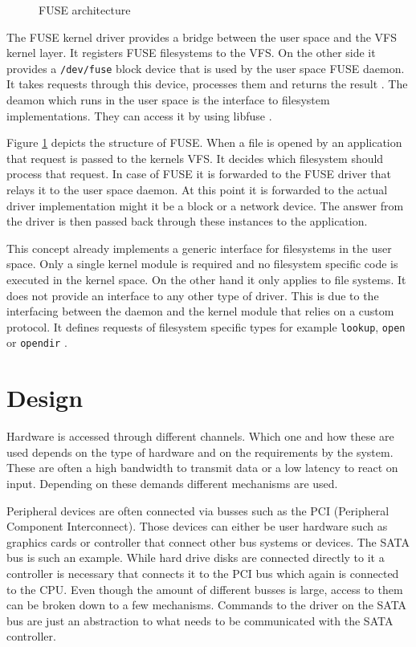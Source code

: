 \documentclass[
a4paper,
12pt,
notitlepage,
parskip=half,
DIV=11,
]{scrbook}
\begin{document}
		\begin{figure}
			\centering
			\def\svgwidth{0.8\textwidth}
			
			\caption{FUSE architecture \citep{202324}}
			\label{fusearch}
		\end{figure}
	
		The FUSE kernel driver provides a bridge between the user space and the VFS kernel layer.
		It registers FUSE filesystems to the VFS.
		On the other side it provides a \texttt{/dev/fuse} block device that is used by the user space FUSE daemon. It takes requests through this device, processes them and returns the result \citep{202324}.
		The deamon which runs in the user space is the interface to filesystem implementations.
		They can access it by using libfuse \citep{fuse}.
		
		Figure \ref{fusearch} depicts the structure of FUSE.
		When a file is opened by an application that request is passed to the kernels VFS.
		It decides which filesystem should process that request.
		In case of FUSE it is forwarded to the FUSE driver that relays it to the user space daemon.
		At this point it is forwarded to the actual driver implementation might it be a block or a network device.
		The answer from the driver is then passed back through these instances to the application. \citep{202324}
		
		This concept already implements a generic interface for filesystems in the user space.
		Only a single kernel module is required and no filesystem specific code is executed in the kernel space.
		On the other hand it only applies to file systems.
		It does not provide an interface to any other type of driver.
		This is due to the interfacing between the daemon and the kernel module that relies on a custom protocol.
		It defines requests of filesystem specific types for example \texttt{lookup}, \texttt{open} or \texttt{opendir} \citep{202324}.
	
	
	\chapter{Design}
	
		Hardware is accessed through different channels.
		Which one and how these are used depends on the type of hardware and on the requirements by the system.
		These are often a high bandwidth to transmit data or a low latency to react on input.
		Depending on these demands different mechanisms are used.
		
		Peripheral devices are often connected via busses such as the PCI (Peripheral Component Interconnect).
		Those devices can either be user hardware such as graphics cards or controller that connect other bus systems or devices.
		The SATA bus is such an example.
		While hard drive disks are connected directly to it a controller is necessary that connects it to the PCI bus which again is connected to the CPU.
		Even though the amount of different busses is large, access to them can be broken down to a few mechanisms.
		Commands to the driver on the SATA bus are just an abstraction to what needs to be communicated with the SATA controller. \citep{iosystems}
		
\end{document}
